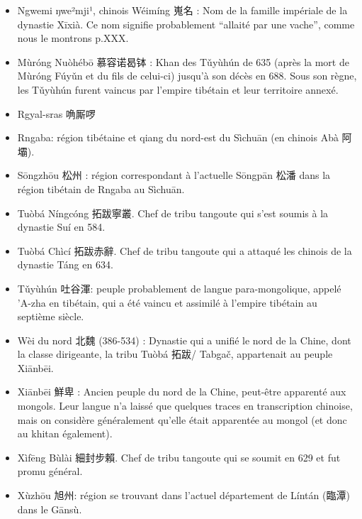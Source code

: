 \documentclass[oldfontcommands,oneside,a4paper,11pt]{memoir}
\newcommand{\ipa}[1]{{\phon #1}} %
\newcommand{\ipapl}[1]{{\phondroit #1}}
\newcommand{\zh}[1]{{\cn #1}}
\newcommand{\uh}{\v{u}}
\begin{document}
\begin{itemize}
\item Ngwemi  \ipa{ŋwe²mji¹}, chinois \ipa{Wéimíng} \zh{嵬名} : Nom de la famille impériale de la dynastie Xīxià. Ce nom signifie probablement ``allaité par une vache'', comme nous le montrons p.XXX.
\item Mùróng Nuòhébō \zh{慕容诺曷钵} : Khan des T\uh{}yùhún de 635 (après la mort de Mùróng Fúy\uh{}n et du fils de celui-ci) jusqu'à son décès en 688. Sous son règne, les T\uh{}yùhún furent vaincus par l'empire tibétain et leur territoire annexé.
\item Rgyal-sras \zh{唃厮啰}
\item Rngaba: région tibétaine et qiang du nord-est du Sìchuān (en chinois Abà \zh{阿壩}).
\item Sōngzhōu \zh{松州} : région correspondant à l'actuelle Sōngpān \zh{松潘} dans la région tibétain de Rngaba au Sìchuān.
\item Tuòbá Níngcóng \zh{拓跋寧叢}. Chef de tribu tangoute qui s'est soumis à la dynastie Suí en 584.
\item Tuòbá Chìcí \zh{拓跋赤辭}. Chef de tribu tangoute qui a attaqué les chinois de la dynastie Táng en 634.
\item T\uh{}yùhún \zh{吐谷渾}: peuple probablement de langue para-mongolique, appelé 'A-zha en tibétain, qui a été vaincu et assimilé à l'empire tibétain au septième siècle.
\item Wèi du nord \zh{北魏} (386-534) : Dynastie  qui a unifié le nord de la Chine, dont la classe dirigeante, la tribu Tuòbá \zh{拓跋}/ \ipapl{Tabgač}, appartenait au peuple Xiānbēi.
\item Xiānbēi \zh{鮮卑} : Ancien peuple du nord de la Chine, peut-être apparenté aux mongols. Leur langue n'a laissé que quelques traces en transcription chinoise, mais on considère généralement qu'elle était apparentée au mongol (et donc au khitan également).
\item Xìfēng Bùlài \zh{細封步賴}. Chef de tribu tangoute qui se soumit en 629 et fut promu général.
\item Xùzhōu \zh{旭州}: région se trouvant dans l'actuel département de Líntán (\zh{臨潭}) dans le Gānsù.

\end{itemize}









\end{document}
